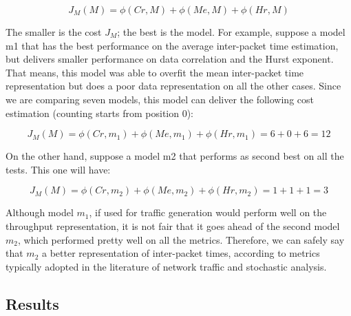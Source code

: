 \begin{equation}
\label{eq:cost-function}
J_M(M) = \phi(Cr, M) + \phi(Me, M) + \phi(Hr, M)
\end{equation}

The smaller is the cost $J_M$; the best is the model. For example, suppose a model m1 that has the best performance on the average inter-packet time estimation, but delivers smaller performance on data correlation and the Hurst exponent. That means, this model was able to overfit the mean inter-packet time representation but does a poor data representation on all the other cases. Since we are comparing seven models, this model can deliver the following cost estimation (counting starts from position 0):

\begin{equation}
\label{eq:cost-function-ex1}
J_M(M) = \phi(Cr, m_1) + \phi(Me, m_1) + \phi(Hr, m_1) = 6 + 0 + 6 = 12
\end{equation}

On the other hand, suppose a model m2 that performs as second best on all the tests. This one will have:

\begin{equation}
\label{eq:cost-function-ex2}
J_M(M) = \phi(Cr, m_2) + \phi(Me, m_2) + \phi(Hr, m_2) = 1 + 1 + 1 = 3
\end{equation}

Although model $m_1$, if used for traffic generation would perform well on the throughput representation, it is not fair that it goes ahead of the second model $m_2$, which performed pretty well on all the metrics. Therefore, we can safely say that  $m_2$ a better representation of inter-packet times, according to metrics typically adopted in the literature of network traffic and stochastic analysis. 


\subsection{Results}


